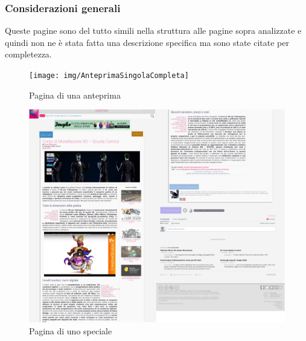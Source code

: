 \documentclass[../ProgettoTecWeb2.tex]{subfiles}
\begin{document}
		\subsubsection{Considerazioni generali}
		Queste pagine sono del tutto simili nella struttura alle pagine sopra analizzate e quindi non ne è stata fatta una descrizione specifica ma sono state citate per completezza.
	\begin{figure} [H]
		\centering
		\texttt{[image: img/AnteprimaSingolaCompleta]}
		\caption{Pagina di una anteprima}
	\end{figure}
	\begin{figure} [H]
		\centering
		\includegraphics[scale=0.18]{img/SpecialeSingolaCompleta}
		\caption{Pagina di uno speciale}
	\end{figure}

	\newpage
\end{document}
